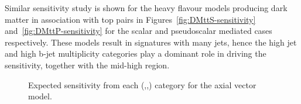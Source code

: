 Similar sensitivity study is shown for the heavy flavour models producing dark matter in association with top pairs in Figures~\ref{fig:DMttS-sensitivity} and~\ref{fig:DMttP-sensitivity} for the scalar and pseudoscalar mediated cases respectively. These models result in signatures with many jets, hence the high jet and high b-jet multiplicity categories play a dominant role in driving the sensitivity, together with the mid-high \scalht region. 

\begin{figure}[h!] \centering
{}
\caption{Expected sensitivity from each (\nj,\nb,\scalht) category for the axial vector model.}
\label{fig:DMA-sensitivity} 
\end{figure}

